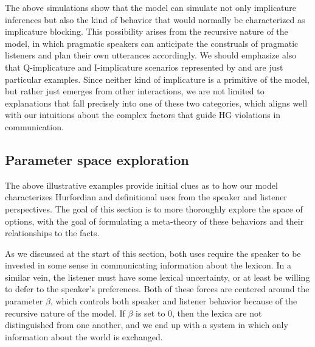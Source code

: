 \documentclass[12pt,twoside]{article}
\renewcommand{\_}{\textbf{\textunderscore\hspace{-4pt}\textunderscore\hspace{-3pt}\textunderscore\hspace{-4pt}\textunderscore}\hspace{0.5pt}}			%
\begin{document}
The above simulations show that the model can simulate not only
implicature inferences but also the kind of behavior that would
normally be characterized as implicature blocking. This possibility
arises from the recursive nature of the model, in which pragmatic
speakers can anticipate the construals of pragmatic listeners and plan
their own utterances accordingly. We should emphasize also that
Q-implicature and I-implicature scenarios represented by
 and  are just particular
examples. Since neither kind of implicature is a primitive of the
model, but rather just emerges from other interactions, we are not
limited to explanations that fall precisely into one of these two
categories, which aligns well with our intuitions about the complex
factors that guide HG violations in communication.


\subsection{Parameter space exploration}\label{sec:characterization}

The above illustrative examples provide initial clues as to how our
model characterizes Hurfordian and definitional uses from the speaker
and listener perspectives. The goal of this section is to more
thoroughly explore the space of options, with the goal of formulating
a meta-theory of these behaviors and their relationships to the facts.

As we discussed at the start of this section, both uses require the
speaker to be invested in some sense in communicating information
about the lexicon.  In a similar vein, the listener must have some
lexical uncertainty, or at least be willing to defer to the speaker's
preferences. Both of these forces are centered around the parameter
$\beta$, which controls both speaker and listener behavior because of
the recursive nature of the model. If $\beta$ is set to $0$, then the
lexica are not distinguished from one another, and we end up with a
system in which only information about the world is exchanged.
\end{document}
